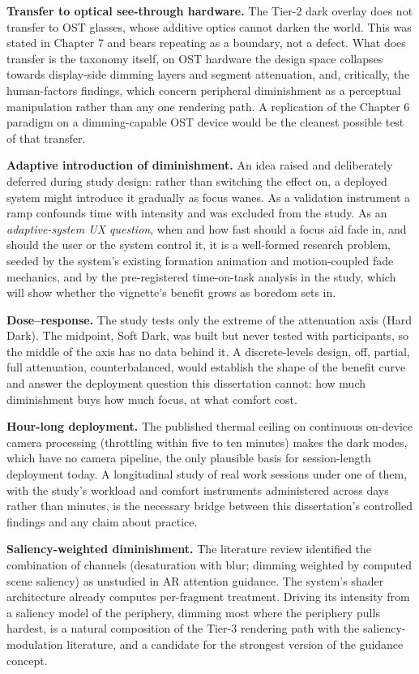 \textbf{Transfer to optical see-through hardware.} The Tier-2 dark overlay does not transfer to OST
glasses, whose additive optics cannot darken the world. This was stated in Chapter 7 and bears
repeating as a boundary, not a defect. What does transfer is the taxonomy itself, on OST hardware
the design space collapses towards display-side dimming layers and segment attenuation, and,
critically, the human-factors findings, which concern peripheral diminishment as a perceptual
manipulation rather than any one rendering path. A replication of the Chapter 6 paradigm on a
dimming-capable OST device would be the cleanest possible test of that transfer.

\textbf{Adaptive introduction of diminishment.} An idea raised and deliberately deferred during study
design: rather than switching the effect on, a deployed system might introduce it gradually as focus
wanes. As a validation instrument a ramp confounds time with intensity and was excluded from the
study. As an \textit{adaptive-system UX question}, when and how fast should a focus aid fade in, and should
the user or the system control it, it is a well-formed research problem, seeded by the system's
existing formation animation and motion-coupled fade mechanics, and by the pre-registered
time-on-task analysis in the study, which will show whether the vignette's benefit grows as boredom
sets in.

\textbf{Dose–response.} The study tests only the extreme of the attenuation axis (Hard Dark). The
midpoint, Soft Dark, was built but never tested with participants, so the middle of the axis has no
data behind it. A discrete-levels design, off, partial,
full attenuation, counterbalanced, would establish the shape of the benefit curve and answer the
deployment question this dissertation cannot: how much diminishment buys how much focus, at what
comfort cost.

\textbf{Hour-long deployment.} The published thermal ceiling on continuous on-device camera processing
(throttling within five to ten minutes) makes the dark modes, which have no camera pipeline, the
only plausible basis for session-length deployment today. A longitudinal study of real work sessions
under one of them, with the study's workload and comfort instruments administered across days rather
than minutes, is the necessary bridge between this dissertation's controlled findings and any claim
about practice.

\textbf{Saliency-weighted diminishment.} The literature review identified the combination of channels
(desaturation with blur; dimming weighted by computed scene saliency) as unstudied in AR attention
guidance. The system's shader architecture already computes per-fragment treatment. Driving its
intensity from a saliency model of the periphery, dimming most where the periphery pulls hardest,
is a natural composition of the Tier-3 rendering path with the saliency-modulation literature, and a
candidate for the strongest version of the guidance concept.

